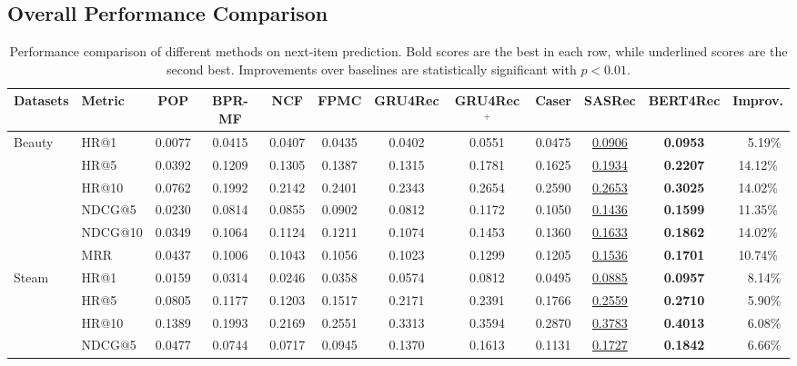 \subsection{Overall Performance Comparison}
\begin{table}[]
\setlength{\tabcolsep}{0.62em}
    \centering
    \caption{Performance comparison of different methods on next-item prediction. Bold scores are the best in each row, while underlined scores are the second best. Improvements over baselines are statistically significant with $p<0.01$.} %
    \begin{adjustbox}{max width=\textwidth}
        \begin{tabular}{l l c c c c c c c c c c}
        \toprule
        Datasets & Metric & POP & BPR-MF & NCF & FPMC & GRU4Rec & GRU4Rec$^+$ & Caser & SASRec & BERT4Rec & Improv.\\
        \midrule
        \multirow{6}{*}{Beauty} & HR@1 & 0.0077 & 0.0415 & 0.0407 & 0.0435 & 0.0402 & 0.0551 & 0.0475 & \underline{0.0906} & \textbf{0.0953} & ~~5.19\% \\
         & HR@5 & 0.0392 & 0.1209 & 0.1305 & 0.1387 & 0.1315 & 0.1781 & 0.1625 & \underline{0.1934} & \textbf{0.2207} & 14.12\%\\
         & HR@10 & 0.0762 & 0.1992 & 0.2142 & 0.2401 & 0.2343 & 0.2654 & 0.2590 & \underline{0.2653} & \textbf{0.3025} & 14.02\%\\
         & NDCG@5 & 0.0230 & 0.0814 & 0.0855 & 0.0902 & 0.0812 & 0.1172 & 0.1050 & \underline{0.1436} & \textbf{0.1599} & 11.35\%\\
         & NDCG@10 & 0.0349 & 0.1064 & 0.1124 & 0.1211 & 0.1074 & 0.1453 & 0.1360 & \underline{0.1633} & \textbf{0.1862} & 14.02\%\\
          & MRR & 0.0437 & 0.1006 & 0.1043 & 0.1056 & 0.1023 & 0.1299 & 0.1205 & \underline{0.1536} & \textbf{0.1701} & 10.74\%\\
         \midrule
        \multirow{6}{*}{Steam} & HR@1 & 0.0159 & 0.0314 & 0.0246 & 0.0358 & 0.0574 & 0.0812 & 0.0495 & \underline{0.0885} & \textbf{0.0957} & ~~8.14\%\\
         & HR@5 & 0.0805 & 0.1177 & 0.1203 & 0.1517 & 0.2171 & 0.2391 & 0.1766 & \underline{0.2559} & \textbf{0.2710} & ~~5.90\%\\
         & HR@10 & 0.1389 & 0.1993 & 0.2169 & 0.2551 & 0.3313 & 0.3594 & 0.2870 & \underline{0.3783} & \textbf{0.4013} & ~~6.08\% \\
         & NDCG@5 & 0.0477 & 0.0744 & 0.0717 & 0.0945 & 0.1370 & 0.1613 & 0.1131 & \underline{0.1727} & \textbf{0.1842} & ~~6.66\% \\

\end{tabular}
\end{adjustbox}
\end{table}
